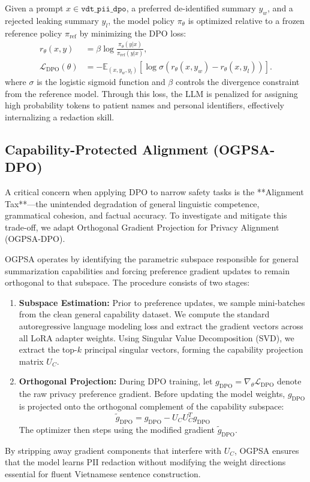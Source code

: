 \documentclass[11pt]{article}
\begin{document}
Given a prompt $x \in \texttt{vdt\_pii\_dpo}$, a preferred de-identified summary $y_w$, and a rejected leaking summary $y_l$, the model policy $\pi_\theta$ is optimized relative to a frozen reference policy $\pi_{\text{ref}}$ by minimizing the DPO loss:
\begin{align}
    r_\theta(x,y)
    &= \beta \log \frac{\pi_\theta(y|x)}{\pi_{\text{ref}}(y|x)}, \\
    \mathcal{L}_{\text{DPO}}(\theta)
    &= -\mathbb{E}_{(x, y_w, y_l)}
    \left[\log \sigma\left(r_\theta(x,y_w)-r_\theta(x,y_l)\right)\right].
\end{align}
where $\sigma$ is the logistic sigmoid function and $\beta$ controls the divergence constraint from the reference model. Through this loss, the LLM is penalized for assigning high probability tokens to patient names and personal identifiers, effectively internalizing a redaction skill.

\subsection{Capability-Protected Alignment (OGPSA-DPO)}
A critical concern when applying DPO to narrow safety tasks is the **Alignment Tax**---the unintended degradation of general linguistic competence, grammatical cohesion, and factual accuracy. To investigate and mitigate this trade-off, we adapt Orthogonal Gradient Projection for Privacy Alignment (OGPSA-DPO).

OGPSA operates by identifying the parametric subspace responsible for general summarization capabilities and forcing preference gradient updates to remain orthogonal to that subspace. The procedure consists of two stages:
\begin{enumerate}
    \item \textbf{Subspace Estimation:} Prior to preference updates, we sample mini-batches from the clean general capability dataset. We compute the standard autoregressive language modeling loss and extract the gradient vectors across all LoRA adapter weights. Using Singular Value Decomposition (SVD), we extract the top-$k$ principal singular vectors, forming the capability projection matrix $U_C$.
    \item \textbf{Orthogonal Projection:} During DPO training, let $g_{\text{DPO}} = \nabla_\theta \mathcal{L}_{\text{DPO}}$ denote the raw privacy preference gradient. Before updating the model weights, $g_{\text{DPO}}$ is projected onto the orthogonal complement of the capability subspace:
    \begin{equation}
        \tilde{g}_{\text{DPO}} = g_{\text{DPO}} - U_C U_C^T g_{\text{DPO}}
    \end{equation}
    The optimizer then steps using the modified gradient $\tilde{g}_{\text{DPO}}$.
\end{enumerate}
By stripping away gradient components that interfere with $U_C$, OGPSA ensures that the model learns PII redaction without modifying the weight directions essential for fluent Vietnamese sentence construction.
\end{document}
